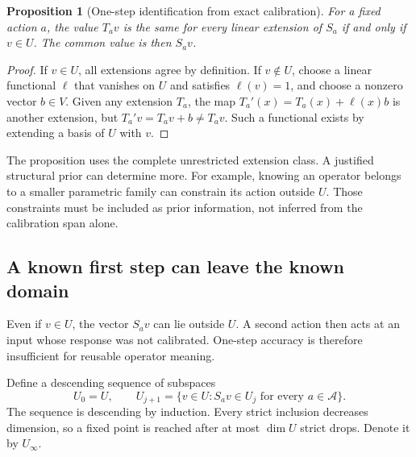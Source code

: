 \documentclass[11pt,letterpaper]{article}
\theoremstyle{plain}
\newtheorem{proposition}[theorem]{Proposition}
\theoremstyle{definition}
\newcommand{\A}{\mathcal A}\newcommand{\C}{\mathcal C}\newcommand{\E}{\mathcal E}
\begin{document}
\begin{proposition}[One-step identification from exact calibration]\label{prop:onestep}
For a fixed action $a$, the value $T_av$ is the same for every linear extension of $S_a$ if and only if $v\in U$. The common value is then $S_av$.
\end{proposition}
\begin{proof}
If $v\in U$, all extensions agree by definition. If $v\notin U$, choose a linear functional $\ell$ that vanishes on $U$ and satisfies $\ell(v)=1$, and choose a nonzero vector $b\in V$. Given any extension $T_a$, the map $T_a'(x)=T_a(x)+\ell(x)b$ is another extension, but $T_a'v=T_av+b\ne T_av$. Such a functional exists by extending a basis of $U$ with $v$.
\end{proof}

The proposition uses the complete unrestricted extension class. A justified structural prior can determine more. For example, knowing an operator belongs to a smaller parametric family can constrain its action outside $U$. Those constraints must be included as prior information, not inferred from the calibration span alone.

\subsection{A known first step can leave the known domain}
Even if $v\in U$, the vector $S_av$ can lie outside $U$. A second action then acts at an input whose response was not calibrated. One-step accuracy is therefore insufficient for reusable operator meaning.

Define a descending sequence of subspaces
\[
U_0=U,\qquad
U_{j+1}=\{v\in U:S_av\in U_j\text{ for every }a\in\A\}.\tag{7}
\]
The sequence is descending by induction. Every strict inclusion decreases dimension, so a fixed point is reached after at most $\dim U$ strict drops. Denote it by $U_\infty$.
\end{document}
